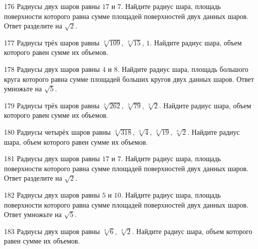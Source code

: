 \documentclass[a4paper]{article}
\begin{document}
\begin{taskBN}{176}
Радиусы двух шаров равны $17$ и $7$. Найдите радиус шара, площадь поверхности которого равна сумме площадей поверхностей двух данных шаров. Ответ разделите на $\sqrt{2}$.
\end{taskBN}

\begin{taskBN}{177}
Радиусы трёх шаров равны $\sqrt[3]{109}$, $\sqrt[3]{15}$, $1$. Найдите радиус шара, объем которого равен сумме их объемов.
\end{taskBN}

\begin{taskBN}{178}
Радиусы двух шаров равны $4$ и $8$. Найдите радиус шара, площадь большого круга которого равна сумме площадей больших кругов двух данных шаров. Ответ умножьте на $\sqrt{5}$.
\end{taskBN}

\begin{taskBN}{179}
Радиусы трёх шаров равны $\sqrt[3]{262}$, $\sqrt[3]{79}$, $\sqrt[3]{2}$. Найдите радиус шара, объем которого равен сумме их объемов.
\end{taskBN}

\begin{taskBN}{180}
Радиусы четырёх шаров равны $\sqrt[3]{318}$, $\sqrt[3]{4}$, $\sqrt[3]{19}$, $\sqrt[3]{2}$. Найдите радиус шара, объем которого равен сумме их объемов.
\end{taskBN}

\begin{taskBN}{181}
Радиусы двух шаров равны $17$ и $7$. Найдите радиус шара, площадь поверхности которого равна сумме площадей поверхностей двух данных шаров. Ответ разделите на $\sqrt{2}$.
\end{taskBN}

\begin{taskBN}{182}
Радиусы двух шаров равны $5$ и $10$. Найдите радиус шара, площадь поверхности которого равна сумме площадей поверхностей двух данных шаров. Ответ умножьте на $\sqrt{5}$.
\end{taskBN}

\begin{taskBN}{183}
Радиусы двух шаров равны $\sqrt[3]{6}$, $\sqrt[3]{2}$. Найдите радиус шара, объем которого равен сумме их объемов.
\end{taskBN}
\end{document}
